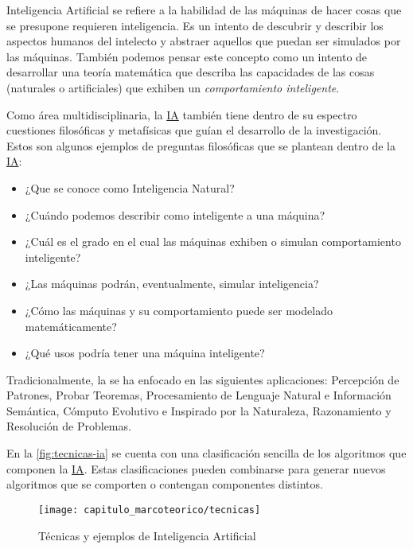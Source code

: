Inteligencia Artificial se refiere a la
habilidad de las máquinas de hacer cosas que se presupone requieren
inteligencia. Es un intento de descubrir y describir los aspectos humanos del
intelecto y abstraer aquellos que puedan ser simulados por las máquinas. También
podemos pensar este concepto como un intento de desarrollar una teoría
matemática que describa las capacidades de las cosas (naturales o artificiales)
que exhiben un \emph{comportamiento inteligente}. 

Como área multidisciplinaria, la \hyperlink{abbr}{IA} también tiene dentro de su espectro
cuestiones filosóficas y metafísicas que guían el desarrollo de la
investigación. Estos son algunos ejemplos de preguntas filosóficas que se
plantean dentro de la \hyperlink{abbr}{IA}:

\begin{itemize}
    \item ¿Que se conoce como Inteligencia Natural?
    \item ¿Cuándo podemos describir como inteligente a una máquina?
    \item ¿Cuál es el grado en el cual las máquinas exhiben o simulan comportamiento inteligente?
    \item ¿Las máquinas podrán, eventualmente, simular inteligencia?
    \item ¿Cómo las máquinas y su comportamiento puede ser modelado matemáticamente?
    \item ¿Qué usos podría tener una máquina inteligente?
\end{itemize}

Tradicionalmente, la  se ha enfocado en las siguientes aplicaciones:
Percepción de Patrones, Probar Teoremas, Procesamiento de Lenguaje Natural e
Información Semántica, Cómputo Evolutivo e Inspirado por la Naturaleza,
Razonamiento y Resolución de Problemas.~\cite{Jackson1985}

En la \autoref{fig:tecnicas-ia} se cuenta con una clasificación sencilla de los
algoritmos que componen la \hyperlink{abbr}{IA}. Estas clasificaciones pueden
combinarse para generar nuevos algoritmos que se comporten o contengan
componentes distintos.

\begin{figure}[H]
    \centering
    \texttt{[image: capitulo\_marcoteorico/tecnicas]}
    \caption{Técnicas y ejemplos de Inteligencia Artificial}\label{fig:tecnicas-ia}
\end{figure}

